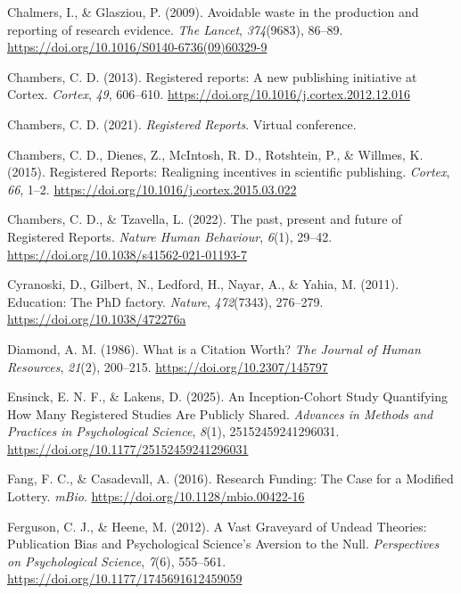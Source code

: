 \documentclass[
  british,
  a4paper,
  ,man,floatsintext]{apa6}
\newlength{\cslhangindent}
\newenvironment{CSLReferences}[2] %
 {\begin{list}{}{%
  \setlength{\itemindent}{0pt}
  \setlength{\leftmargin}{0pt}
  \setlength{\parsep}{0pt}
  \ifodd #1
   \setlength{\leftmargin}{\cslhangindent}
   \setlength{\itemindent}{-1\cslhangindent}
  \fi
  \setlength{\itemsep}{#2\baselineskip}}}
 {\end{list}}
\begin{document}
\begin{CSLReferences}{1}{0}
Chalmers, I., \& Glasziou, P. (2009). Avoidable waste in the production and reporting of research evidence. \emph{The Lancet}, \emph{374}(9683), 86--89. \url{https://doi.org/10.1016/S0140-6736(09)60329-9}

Chambers, C. D. (2013). Registered reports: {A} new publishing initiative at {Cortex}. \emph{Cortex}, \emph{49}, 606--610. \url{https://doi.org/10.1016/j.cortex.2012.12.016}

Chambers, C. D. (2021). \emph{Registered {Reports}}. Virtual conference.

Chambers, C. D., Dienes, Z., McIntosh, R. D., Rotshtein, P., \& Willmes, K. (2015). Registered {Reports}: {Realigning} incentives in scientific publishing. \emph{Cortex}, \emph{66}, 1--2. \url{https://doi.org/10.1016/j.cortex.2015.03.022}

Chambers, C. D., \& Tzavella, L. (2022). The past, present and future of {Registered Reports}. \emph{Nature Human Behaviour}, \emph{6}(1), 29--42. \url{https://doi.org/10.1038/s41562-021-01193-7}

Cyranoski, D., Gilbert, N., Ledford, H., Nayar, A., \& Yahia, M. (2011). Education: {The PhD} factory. \emph{Nature}, \emph{472}(7343), 276--279. \url{https://doi.org/10.1038/472276a}

Diamond, A. M. (1986). What is a {Citation Worth}? \emph{The Journal of Human Resources}, \emph{21}(2), 200--215. \url{https://doi.org/10.2307/145797}

Ensinck, E. N. F., \& Lakens, D. (2025). An {Inception-Cohort Study Quantifying How Many Registered Studies Are Publicly Shared}. \emph{Advances in Methods and Practices in Psychological Science}, \emph{8}(1), 25152459241296031. \url{https://doi.org/10.1177/25152459241296031}

Fang, F. C., \& Casadevall, A. (2016). Research {Funding}: The {Case} for a {Modified Lottery}. \emph{mBio}. \url{https://doi.org/10.1128/mbio.00422-16}

Ferguson, C. J., \& Heene, M. (2012). A {Vast Graveyard} of {Undead Theories}: {Publication Bias} and {Psychological Science}'s {Aversion} to the {Null}. \emph{Perspectives on Psychological Science}, \emph{7}(6), 555--561. \url{https://doi.org/10.1177/1745691612459059}


\end{CSLReferences}
\end{document}
